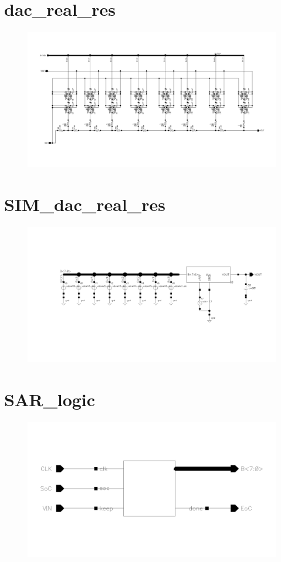 \documentclass[english, 12pt, a4paper]{ifimaster}
\begin{document}
\begin{appendices}
\section{dac\_real\_res}
\begin{figure}[!ht]
 \centering
 \includegraphics[width=20cm, angle=90]{img/dac_schem}
 \label{app:dac:real:res}
\end{figure}
\newpage
\section{SIM\_dac\_real\_res}
\begin{figure}[!ht]
 \centering
 \includegraphics[width=20cm, angle=90]{img/SIM_dac_schem}
 \label{app:SIM:dac:real:res}
\end{figure}

\newpage
\section{SAR\_logic}
\begin{figure}[!ht]
 \centering
 \includegraphics[width=20cm, angle=90]{img/SAR_logic}
 \label{app:sar:logic}
\end{figure}
\newpage

\end{appendices}
\end{document}
